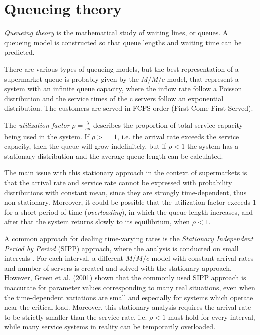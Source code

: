 \section{Queueing theory}
\label{sec:queueing_theory}

\emph{Queueing theory} is the mathematical study of waiting lines, or queues. A queueing model is constructed so that queue lengths and waiting time can be predicted.

There are various types of queueing models, but the best representation of a supermarket queue is probably given by the \( M/M/c \) model, that represent a system with an infinite queue capacity, where the inflow rate follow a Poisson distribution and the service times of the c servers follow an exponential distribution. The customers are served in FCFS order (First Come First Served).

The \emph{utilization factor} \( \rho = \frac{\lambda}{c\mu} \) describes the proportion of total service capacity being used in the system. If \( \rho >= 1\), i.e. the arrival rate exceeds the service capacity, then the queue will grow indefinitely, but if \( \rho < 1\) the system has a stationary distribution and the average queue length can be calculated.

The main issue with this stationary approach in the context of supermarkets is that the arrival rate and service rate cannot be expressed with probability distributions with constant mean, since they are strongly time-dependent, thus non-stationary. Moreover, it could be possible that the utilization factor exceeds 1 for a short period of time (\emph{overloading}), in which the queue length increases, and after that the system returns slowly to its equilibrium, when \( \rho < 1\).

A common approach for dealing time-varying rates is the \emph{Stationary Independent Period by Period} (SIPP) approach, where the analysis is conducted on small intervals \cite{stolletz}. For each interval, a different \( M/M/c \) model with constant arrival rates and number of servers is created and solved with the stationary approach.
However, Green et al. (2001) \cite{green2001} shown that the commonly used SIPP approach is inaccurate for parameter values corresponding to many real situations, even when the time-dependent variations are small and especially for systems which operate near the critical load. Moreover, this stationary analysis requires the arrival rate to be strictly smaller than the service rate, i.e. \( \rho < 1\) must hold for every interval, while many service systems in reality can be temporarily overloaded.

